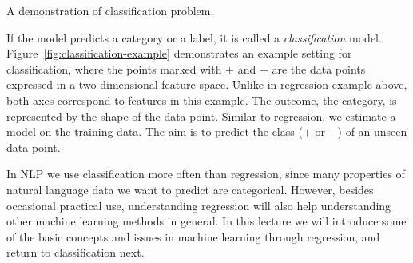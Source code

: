 \begin{marginfigure}
  \caption{\label{fig:classification-example}
    A demonstration of classification problem.
  }
\end{marginfigure}
If the model predicts a category or a label,
it is called a \emph{classification} model.
Figure~\ref{fig:classification-example} demonstrates an example setting
for classification, where the points marked with $+$ and $-$
are the data points expressed in a two dimensional feature space.
Unlike in regression example above,
both axes correspond to features in this example.
The outcome, the category, is represented by the shape of the data point.
Similar to regression, we estimate a model on the training data.
The aim is to predict the class ($+$ or $-$) of an unseen data point.

In NLP we use classification more often than regression,
since many properties of natural language data
we want to predict are categorical.
However, besides occasional practical use,
understanding regression will also help understanding
other machine learning methods in general.
In this lecture we will introduce some of the basic concepts and issues
in machine learning through regression,
and return to classification next.

